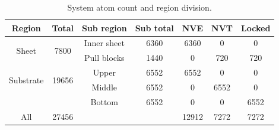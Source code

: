 



\begin{table}[H]
  \begin{center}
  \caption{System atom count and region division.}
  \label{tab:system_count}
  \begin{tabular}{ |c|| c | c | c | c | c | c |} \hline
    \textbf{Region} & \textbf{Total}  & Sub region & Sub total & \textbf{NVE} & \textbf{NVT} & \textbf{Locked} \\ \hline   
    \multirow{2}{*}{Sheet} & \multirow{2}{*}{7800} & Inner sheet & 6360 & 6360 & 0 & 0 \\ %
    & & Pull blocks & 1440 & 0 & 720 & 720 \\ \hline   
    \multirow{2}{*}{Substrate} & \multirow{2}{*}{19656} & Upper & 6552 & 6552 & 0 & 0 \\ %
    & & Middle & 6552 & 0 & 6552 & 0 \\ %
    & & Bottom & 6552 & 0 & 0 & 6552 \\ \hline \hline   
    All & 27456 & \multicolumn{2}{r|}{} & 12912 & 7272 & 7272 \\ \hline 
  \end{tabular}
  \end{center}
\end{table}





